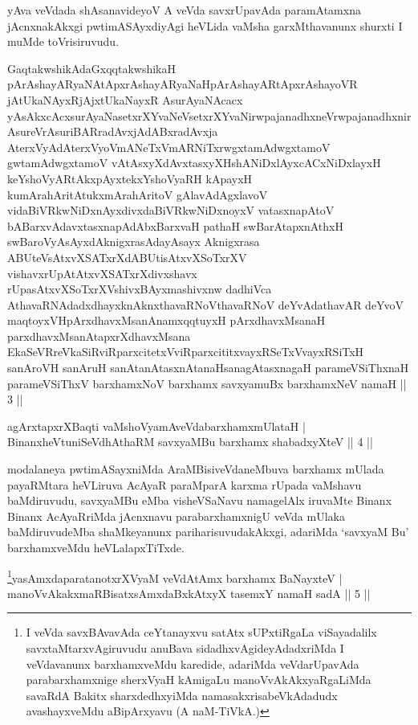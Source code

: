 \vskip 2pt
\begin{artha}
yAva veVdada shAsanavideyoV A veVda savxrUpavAda paramAtamxna jAcnxnakAkxgi pwtimASAyxdiyAgi heVLida vaMsha garxMthavanunx shurxti I muMde toVrisiruvudu.
\end{artha}
\vskip 2pt
\vskip 2pt
\begin{kandikeshl}
GaqtakwshikAdaGxqqtakwshikaH pArAshayARyaNAtApxrAshayARyaNaH\break pArAshayARtApxrAshayoVR jAtUkaNAyxRjAjxtUkaNayxR AsurAyaNAcacx yAsAkxcAcxsurAyaNasetxrXYvaNeVsetxrXYvaNirwpajanadhxneVrwpajanadhx\break nirAsureVrAsuriBARradAvxjAdABxradAvxja AterxVyAdAterxVyoV\break mANeTxVmARNiTxrwgxtamAdwgxtamoV gwtamAdwgxtamoV vAtAsxyXdAvxtasxyXH\break shANiDxlAyxcACxNiDxlayxH keYshoVyARtAkxpAyxtekxYshoVyaRH kApayxH kumArahAritAtukxmArahAritoV gAlavAdAgxlavoV vidaBiVRkwNiDxnAyxdivxdaBiVR\-\break kwNiDxnoyxV vatasxnapAtoV bABarxvAdavxtasxnapAdAbxBarxvaH pathaH swBarAtapxnAthxH swBaroV\s yAsAyxdAknigxrasAdayAsayx Aknigxrasa ABUteVsAtxvXSATxrXdABUtisAtxvXSoTxrXV vishavxrUpAtAtxvXSATxrXdivxshavx rUpasAtxvXSoTxrXV\s shivxBAyxmashivxnw dadhiVca AthavaRNAdadxdhayxknAknxthavaRNoV\s thavaRNoV deYvAdathavAR deYvoV maqtoyxVH\break pArxdhavxMsanAnamxqqtuyxH pArxdhavxMsanaH parxdhavxMsanAtapxrXdhavxMsana EkaSeVRreVkaSiRviRparxcitetxVviRparxcititxvayxRSeTxVvayxRSiTxH sanAroVH sanAruH sanAtanAtasxnAtanaH\break sanagAtasxnagaH parameVSiThxnaH parameVSiThxV barxhamxNoV barxhamx savxyamuBx barxhamxNeV namaH || 3 ||
\end{kandikeshl}
\vskip 2pt
\begin{shl}
agArxtapxrXBaqti vaMshoV\s yamAveVdabarxhamxmUlataH |\\
BinanxheVtuniSeVdhAthaRM savxyaMBu barxhamx shabadxyXteV \hfill || 4 ||
\end{shl}
\vskip 2pt
\begin{artha}
modalaneya pwtimASayxniMda AraMBisiveVdaneMbuva barxhamx mUlada\break
payaRMtara heVLiruva AcAyaR paraMparA karxma rUpada vaMshavu
baMdiruvudu, savxyaMBu eMba visheVSaNavu namagelAlx iruvaMte Binanx
Binanx AcAyaRriMda jAcnxnavu parabarxhamxnigU veVda mUlaka
baMdiruvudeMba shaMkeyanunx pariharisuvudakAkxgi, adariMda `savxyaM Bu'
barxhamxveMdu heVLalapxTiTxde.
\end{artha}
\vskip 2pt
\begin{shl}\footnote{I veVda savxBAvavAda ceYtanayxvu satAtx sUPxtiRgaLa viSayadalilx savxtaMtarxvAgiruvudu anuBava sidadhxvAgideyAdadxriMda I veVdavanunx barxhamxveMdu karedide, adariMda veVdarUpavAda parabarxhamxnige sherxVyaH kAmigaLu manoVvAkAkxyaRgaLiMda savaRdA Bakitx sharxdedhxyiMda namasakxrisabeVkAdadudx avashayxveMdu aBipArxyavu (A naM-TiVkA.)}yasAmxdaparatanotxrXV\s yaM veVdAtAmx barxhamx BaNayxteV |\\
manoVvAkakxmaRBisatxsAmxdaBxkAtxyX tasemxY namaH sadA \hfill || 5 ||
\end{shl}

